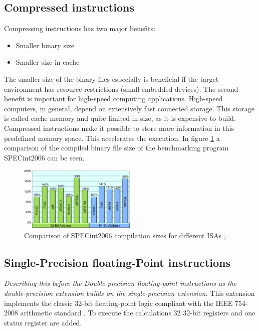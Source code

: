 \subsection{Compressed instructions}
Compressing instructions has two major benefits:
\begin{itemize}
    \item Smaller binary size
    \item Smaller size in cache
\end{itemize}
The smaller size of the binary files especially is beneficial if
the target environment has resource restrictions 
(small embedded devices). The second benefit is important
for high-speed computing applications.
High-speed computers, in general, depend on extensively fast connected
storage. This storage is called cache memory and quite limited in size,
as it is expensive to build.
Compressed instructions make it possible to store more information
in this predefined memory space. This accelerates the execution. In figure 
\ref{fig:kanter_compressed_extension_comparison} a comparison
of the compiled binary file size of the benchmarking program
SPECint2006 can be seen.
\begin{figure}
    \centering
    \includegraphics[width=0.5\textwidth]{figures/kanter_compressed_extension_comparison}
    \caption{Comparison of SPECint2006 compilation sizes for different ISAs
        \cite[p.~4]{Kanter_riscv_compressed_figure}, \cite[p.~16]{risc-v_compressed_workshop}}
    \label{fig:kanter_compressed_extension_comparison}
\end{figure}

\subsection{Single-Precision floating-Point instructions}
\textit{Describing this before the Double-precision floating-point instructions as the double-precision extension builds on the single-precision extension.} \newline
This extension implements the classic 32-bit floating-point logic
compliant with the IEEE 754-2008 arithmetic standard \cite{ieee_754-2008}. 
To execute the calculations 32 32-bit registers and one status register
are added.

